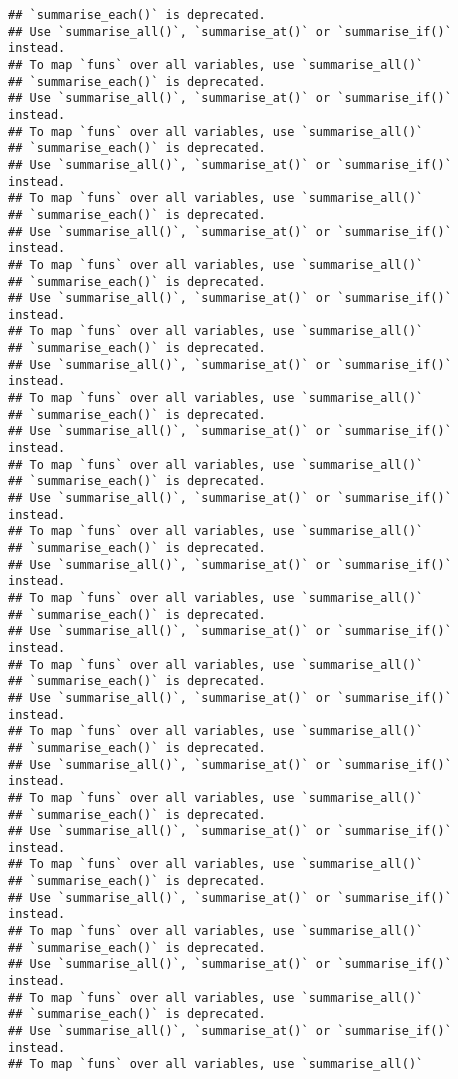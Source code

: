 \documentclass[]{article}
\begin{document}
\begin{verbatim}
## `summarise_each()` is deprecated.
## Use `summarise_all()`, `summarise_at()` or `summarise_if()` instead.
## To map `funs` over all variables, use `summarise_all()`
## `summarise_each()` is deprecated.
## Use `summarise_all()`, `summarise_at()` or `summarise_if()` instead.
## To map `funs` over all variables, use `summarise_all()`
## `summarise_each()` is deprecated.
## Use `summarise_all()`, `summarise_at()` or `summarise_if()` instead.
## To map `funs` over all variables, use `summarise_all()`
## `summarise_each()` is deprecated.
## Use `summarise_all()`, `summarise_at()` or `summarise_if()` instead.
## To map `funs` over all variables, use `summarise_all()`
## `summarise_each()` is deprecated.
## Use `summarise_all()`, `summarise_at()` or `summarise_if()` instead.
## To map `funs` over all variables, use `summarise_all()`
## `summarise_each()` is deprecated.
## Use `summarise_all()`, `summarise_at()` or `summarise_if()` instead.
## To map `funs` over all variables, use `summarise_all()`
## `summarise_each()` is deprecated.
## Use `summarise_all()`, `summarise_at()` or `summarise_if()` instead.
## To map `funs` over all variables, use `summarise_all()`
## `summarise_each()` is deprecated.
## Use `summarise_all()`, `summarise_at()` or `summarise_if()` instead.
## To map `funs` over all variables, use `summarise_all()`
## `summarise_each()` is deprecated.
## Use `summarise_all()`, `summarise_at()` or `summarise_if()` instead.
## To map `funs` over all variables, use `summarise_all()`
## `summarise_each()` is deprecated.
## Use `summarise_all()`, `summarise_at()` or `summarise_if()` instead.
## To map `funs` over all variables, use `summarise_all()`
## `summarise_each()` is deprecated.
## Use `summarise_all()`, `summarise_at()` or `summarise_if()` instead.
## To map `funs` over all variables, use `summarise_all()`
## `summarise_each()` is deprecated.
## Use `summarise_all()`, `summarise_at()` or `summarise_if()` instead.
## To map `funs` over all variables, use `summarise_all()`
## `summarise_each()` is deprecated.
## Use `summarise_all()`, `summarise_at()` or `summarise_if()` instead.
## To map `funs` over all variables, use `summarise_all()`
## `summarise_each()` is deprecated.
## Use `summarise_all()`, `summarise_at()` or `summarise_if()` instead.
## To map `funs` over all variables, use `summarise_all()`
## `summarise_each()` is deprecated.
## Use `summarise_all()`, `summarise_at()` or `summarise_if()` instead.
## To map `funs` over all variables, use `summarise_all()`
## `summarise_each()` is deprecated.
## Use `summarise_all()`, `summarise_at()` or `summarise_if()` instead.
## To map `funs` over all variables, use `summarise_all()`
\end{verbatim}
\end{document}
